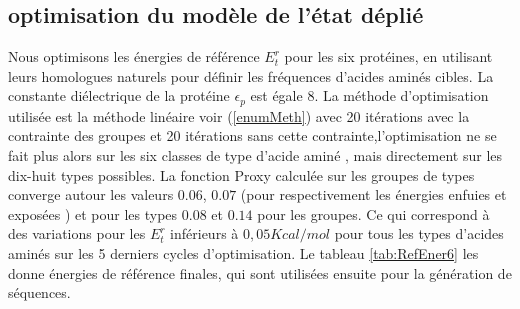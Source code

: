 \subsection{optimisation du modèle de l'état déplié}

Nous optimisons les énergies de référence $E_t^r$ pour les six protéines, en utilisant leurs homologues naturels pour définir les fréquences d'acides aminés cibles. La constante diélectrique de la protéine $\epsilon_p$ est égale $8$. La méthode d'optimisation utilisée est la méthode linéaire voir (\ref{enumMeth}) avec 20 itérations avec la contrainte des groupes et 20 itérations sans cette contrainte,l'optimisation ne se fait plus alors sur les six classes de type d'acide aminé , mais directement sur les dix-huit types possibles. La fonction Proxy calculée sur les groupes de types converge autour les valeurs $0.06$, $0.07$ (pour respectivement les énergies enfuies et exposées ) et pour les types $0.08$ et $0.14$ pour les groupes. Ce qui correspond à des variations  pour les $E_t^r$ inférieurs à $0,05 Kcal/mol$ pour tous les types d'acides aminés sur les 5 derniers cycles d'optimisation. Le tableau \ref{tab:RefEner6} les donne énergies de référence finales, qui sont utilisées ensuite pour la génération de séquences.

